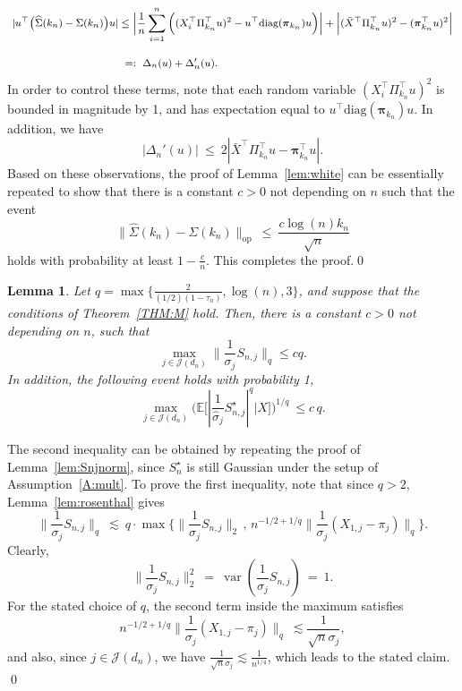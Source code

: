 \documentclass[aos,preprint]{imsart}
\numberwithin{equation}{section}
\theoremstyle{plain}
\newtheorem{lemma}{Lemma}[section]
\renewcommand{\hat}[1]{\widehat{#1}}
\newcommand{\E}{\mathbb{E}}
\newcommand{\var}{\operatorname{var}}
\newcommand{\ttop}{^{\top}}
\newcommand{\ts}{\textstyle}
\newcommand{\1}{{\bf{1}}}
\newcommand{\0}{\mathbf{0}}
\begin{document}
\begin{equation*}
\footnotesize
\begin{split}
|u\ttop\big(\hat\Sigma(k_n)-\Sigma(k_n)\big)u| & \leq  \bigg|\frac1n\sum_{i=1}^n \Big((X_i\ttop \Pi_{k_n}\ttop u)^2-u\ttop\text{diag}(\boldsymbol\pi_{k_n})u\Big)\bigg| + \Big| (\bar X\ttop \Pi_{k_n}\ttop u)^2-(\boldsymbol\pi_{k_n}\ttop u)^2\Big|\\[0.3cm]
%
& \ =: \ \Delta_n(u)+\Delta_n'(u).
\end{split}
\end{equation*}
\normalsize
In order to control these terms, note that each random variable $(X_i\ttop \Pi_{k_n}\ttop u)^2$ is bounded in magnitude by 1, and has expectation equal to $u\ttop \text{diag}(\boldsymbol \pi_{k_n})u$. In addition, we have
$$|\Delta_n'(u)| \ \leq \ 2|\bar X\ttop \Pi_{k_n}\ttop u-\boldsymbol \pi_{k_n}\ttop u|.$$
Based on these observations, the proof of Lemma~\ref{lem:white} can be essentially repeated to show that there is a constant $c>0$ not depending on $n$ such that the event
$$ \big\|\hat\Sigma(k_n)-\Sigma(k_n)\big\|_{\text{op}} \ \leq \ \ts\frac{c\log(n) k_n}{\sqrt{n}}$$
holds with probability at least $1-\frac cn$. This completes the proof.\qed\\


\begin{lemma}\label{lem:SnjnormM} Let $q=\max\{\ts\frac{2}{(1/2)(1-\tau_n)}, \log(n),3\}$, and suppose that the conditions of Theorem~\ref{THM:M} hold.  Then, there is a constant $c>0$ not depending on $n$, such that 
\begin{equation}
\max_{j\in\mathcal{J}(d_n)}\|\ts\frac{1}{\sigma_j}S_{n,j}\|_q \leq cq.
\end{equation}
In addition, the following event holds with probability 1,
\begin{equation}
\max_{j\in\mathcal{J}(d_n)} \Big(\E\big[|\ts\frac{1}{\hat \sigma_j}S_{n,j}^{\star}|^q|X\big] \Big)^{1/q} \ \leq c\, q.
\end{equation}
\end{lemma}
\proof The second inequality can be obtained by repeating the proof of Lemma~\ref{lem:Snjnorm}, since $S_n^{\star}$ is still Gaussian under the setup of Assumption~\ref{A:mult}. To prove the first inequality, note that since $q>2$, Lemma~\ref{lem:rosenthal} gives
\begin{equation}\label{eqn:lemrosenthalfirst}
 \|\ts\frac{1}{\sigma_j}S_{n,j}\|_q \ \lesssim \ q\cdot \max\Big\{  \|\ts\frac{1}{\sigma_j}S_{n,j}\|_2 \, , \,  n^{-1/2+1/q} \|\ts\frac{1}{\sigma_j}(X_{1,j}-\pi_j)\|_q\Big\}.
\end{equation}
Clearly,
\begin{equation*}
 \|\ts\frac{1}{\sigma_j}S_{n,j}\|_2^2 \ = \  \var(\ts\frac{1}{\sigma_j}S_{n,j}) \ = \ 1.
\end{equation*}
For the stated choice of $q$, the second term inside the maximum satisfies
$$n^{-1/2+1/q} \|\ts\frac{1}{\sigma_j}(X_{1,j}-\pi_j)\|_q \ \lesssim \frac{1}{\sqrt n \sigma_j},$$
and also, since $j\in\mathcal{J}(d_n)$, we have $\frac{1}{\sqrt{n}\sigma_j}\lesssim \frac{1}{n^{1/4}}$, which leads to the stated claim. \qed
\end{document}
